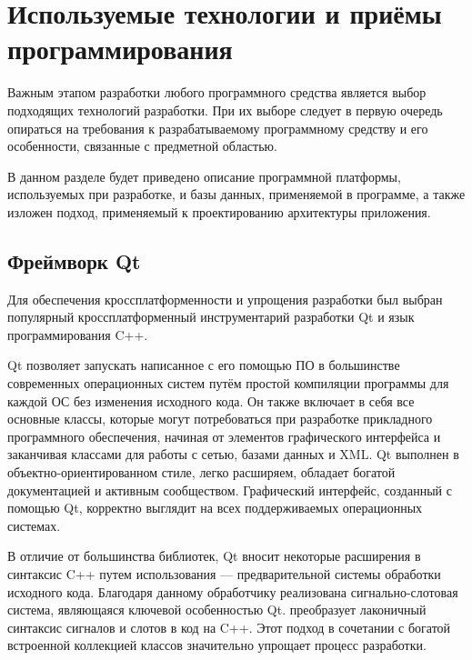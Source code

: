 \section{Используемые технологии и приёмы программирования}

Важным этапом разработки любого программного средства является выбор подходящих
технологий разработки. При их выборе следует в первую очередь опираться на
требования к разрабатываемому программному средству и его особенности, связанные
с предметной областью.

В данном разделе будет приведено описание программной платформы,
используемых при разработке, и базы данных, применяемой в программе, а также
изложен подход, применяемый к проектированию архитектуры приложения.

\subsection{Фреймворк Qt}
\label{sec:qt}

Для обеспечения кроссплатформенности и упрощения разработки был выбран
популярный кроссплатформенный инструментарий разработки Qt и язык
программирования C++.

Qt позволяет запускать написанное с его помощью ПО в большинстве современных
операционных систем путём простой компиляции программы для каждой ОС без
изменения исходного кода. Он также включает в себя все основные классы, которые
могут потребоваться при разработке прикладного программного обеспечения, начиная
от элементов графического интерфейса и заканчивая классами для работы с сетью,
базами данных и XML. Qt выполнен в объектно-ориентированном стиле, легко
расширяем, обладает богатой документацией и активным сообществом. Графический
интерфейс, созданный с помощью Qt, корректно выглядит на всех поддерживаемых
операционных системах.

В отличие от большинства библиотек, Qt вносит некоторые расширения в синтаксис
C++ путем использования \moc{} — предварительной системы
обработки исходного кода. Благодаря данному обработчику реализована
сигнально-слотовая система, являющаяся ключевой особенностью Qt. \moc{}
преобразует лаконичный синтаксис сигналов и слотов в код на C++. Этот подход
в сочетании с богатой встроенной коллекцией классов значительно упрощает
процесс разработки. 

